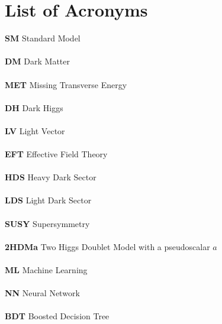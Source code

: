 \documentclass[12pt, a4paper]{book}
\begin{document}

\newpage
\chapter*{List of Acronyms}
\textbf{SM} Standard Model\\\\
\textbf{DM} Dark Matter\\\\
\textbf{MET} Missing Transverse Energy\\\\
\textbf{DH} Dark Higgs\\\\
\textbf{LV} Light Vector\\\\
\textbf{EFT} Effective Field Theory\\\\
\textbf{HDS} Heavy Dark Sector\\\\
\textbf{LDS} Light Dark Sector\\\\
\textbf{SUSY} Supersymmetry\\\\
\textbf{2HDMa} Two Higgs Doublet Model with a pseudoscalar $a$\\\\
\textbf{ML} Machine Learning\\\\
\textbf{NN} Neural Network\\\\
\textbf{BDT} Boosted Decision Tree\\\\
\end{document}
